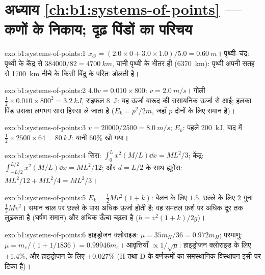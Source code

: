 \section*{अध्याय \ref{ch:b1:systems-of-points} --- कणों के निकाय; दृढ़ पिंडों का परिचय}

\begin{solution}{exo:b1:systems-of-points:1}
$x_G = (2.0 \times 0 + 3.0 \times 1.0)/5.0 = \qty{0.60}{m}$। पृथ्वी--चंद्र:
पृथ्वी के केंद्र से $384000/82 = \qty{4700}{km}$, यानी पृथ्वी के भीतर ही
(\qty{6370}{km}): पृथ्वी अपनी सतह से \qty{1700}{km} नीचे के किसी बिंदु के
परितः डोलती है।
\end{solution}

\begin{solution}{exo:b1:systems-of-points:2}
$4.0v = 0.010 \times 800$: $v = \qty{2.0}{m/s}$। गोली $\tfrac12 \times 0.010
\times 800^2 = \qty{3.2}{kJ}$, राइफ़ल \qty{8}{J}: यह ऊर्जा बारूद की
रासायनिक ऊर्जा से आई; हलका पिंड उसका लगभग सारा हिस्सा ले जाता है
($E_k = p^2/2m$, जहाँ $p$ दोनों के लिए समान है)।
\end{solution}

\begin{solution}{exo:b1:systems-of-points:3}
$v = 20000/2500 = \qty{8.0}{m/s}$; $E_k$: पहले \qty{200}{kJ}, बाद में $\tfrac12 \times
2500 \times 64 = \qty{80}{kJ}$: यानी $60\%$ खो गया।
\end{solution}

\begin{solution}{exo:b1:systems-of-points:4}
सिरा: $\int_0^L x^2(M/L)\dd x = ML^2/3$; केंद्र: $\int_{-L/2}^{L/2}x^2(M/L)
\dd x = ML^2/12$; और $d = L/2$ के साथ ह्यूगेंस: $ML^2/12 + ML^2/4 = ML^2/3$।
\end{solution}

\begin{solution}{exo:b1:systems-of-points:5}
$E_k = \tfrac12 Mv^2(1 + k)$: बेलन के लिए $1.5$, छल्ले के लिए $2$ गुना $\tfrac12 Mv^2$।
समान चाल पर छल्ले के पास अधिक ऊर्जा होती है: वह समतल फ़र्श पर अधिक दूर तक
लुढ़कता है (घर्षण समान) और अधिक ऊँचा चढ़ता है ($h = v^2(1 + k)/2g$)।
\end{solution}

\begin{solution}{exo:b1:systems-of-points:6}
हाइड्रोजन क्लोराइड: $\mu = 35m_H/36 = 0.972m_H$; परमाणु: $\mu = m_e/(1 + 1/1836) =
0.99946m_e$। आवृत्तियाँ $\propto 1/\sqrt\mu$: हाइड्रोजन क्लोराइड के लिए $+1.4\%$, और
हाइड्रोजन के लिए $+0.027\%$ (H तथा D के वर्णक्रमों का समस्थानिक विस्थापन
इसी पर टिका है)।
\end{solution}

